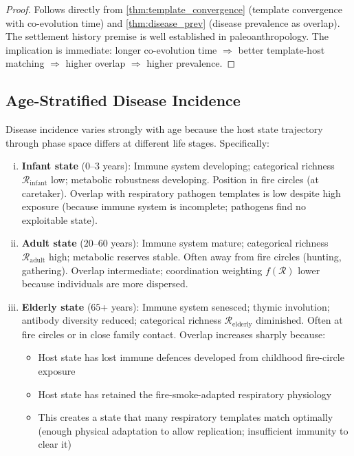 \documentclass[11pt,twocolumn,a4paper]{article}
\newcommand{\Coord}{\mathcal{R}}
\begin{document}
\begin{proof}
Follows directly from \cref{thm:template_convergence} (template convergence with co-evolution time) and \cref{thm:disease_prev} (disease prevalence as overlap). The settlement history premise is well established in paleoanthropology. The implication is immediate: longer co-evolution time $\Rightarrow$ better template-host matching $\Rightarrow$ higher overlap $\Rightarrow$ higher prevalence.
\end{proof}

\subsection{Age-Stratified Disease Incidence}

\begin{theorem}
\label{thm:age_stratified}
Disease incidence varies strongly with age because the host state trajectory through phase space differs at different life stages. Specifically:

\begin{enumerate}[(i)]
\item \textbf{Infant state} ($0$--$3$ years): Immune system developing; categorical richness $\mathcal{R}_{\mathrm{infant}}$ low; metabolic robustness developing. Position in fire circles (at caretaker). Overlap with respiratory pathogen templates is low despite high exposure (because immune system is incomplete; pathogens find no exploitable state).

\item \textbf{Adult state} ($20$--$60$ years): Immune system mature; categorical richness $\mathcal{R}_{\mathrm{adult}}$ high; metabolic reserves stable. Often away from fire circles (hunting, gathering). Overlap intermediate; coordination weighting $f(\Coord)$ lower because individuals are more dispersed.

\item \textbf{Elderly state} ($65$+ years): Immune system senesced; thymic involution; antibody diversity reduced; categorical richness $\mathcal{R}_{\mathrm{elderly}}$ diminished. Often at fire circles or in close family contact. Overlap increases sharply because:
\begin{itemize}
\item Host state has lost immune defences developed from childhood fire-circle exposure
\item Host state has retained the fire-smoke-adapted respiratory physiology
\item This creates a state that many respiratory templates match optimally (enough physical adaptation to allow replication; insufficient immunity to clear it)
\end{itemize}


\end{enumerate}
\end{theorem}
\end{document}
